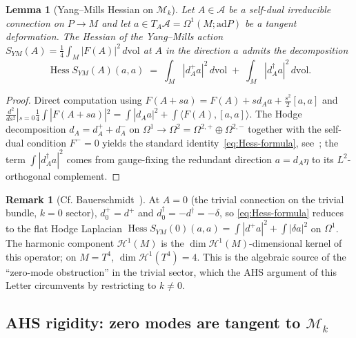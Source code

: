 \documentclass[11pt,a4paper]{amsart}
\newtheorem{lemma}[theorem]{Lemma}
\theoremstyle{definition}
\newtheorem{remark}[theorem]{Remark}
\newcommand{\abs}[1]{\left\lvert#1\right\rvert}
\newcommand{\inner}[2]{\langle #1, #2\rangle}
\newcommand{\ad}{\mathrm{ad}}
\newcommand{\dvol}{\, d\mathrm{vol}}
\newcommand{\Mmod}{\mathcal{M}}
\DeclareMathOperator{\Hess}{Hess}
\begin{document}
\begin{lemma}[Yang--Mills Hessian on $\Mmod_k$]\label{lem:Hess-Mk}
Let $A\in\mathcal A$ be a self-dual irreducible connection on
$P\to M$ and let $a\in T_A\mathcal A = \Omega^1(M;\ad P)$ be a tangent
deformation. The Hessian of the Yang--Mills action
$S_{YM}(A) = \tfrac14\int_M\abs{F(A)}^2\dvol$ at $A$ in the direction $a$
admits the decomposition
\begin{equation}\label{eq:Hess-formula}
\Hess S_{YM}(A)(a,a)
\;=\; \int_M \abs{d_A^+ a}^2 \dvol
   \;+\;\int_M \abs{d_A^\dagger a}^2 \dvol.
\end{equation}
\end{lemma}
\begin{proof}
Direct computation using $F(A+sa) = F(A) + s d_A a + \tfrac{s^2}{2}[a,a]$
and $\tfrac{d^2}{ds^2}|_{s=0}\tfrac14\int|F(A+sa)|^2 = \int|d_A a|^2 +
\int\inner{F(A)}{[a,a]}$. The Hodge decomposition
$d_A = d_A^+ + d_A^-$ on
$\Omega^1\to\Omega^2 = \Omega^{2,+}\oplus\Omega^{2,-}$ together with
the self-dual condition $F^- = 0$ yields the standard
identity~\eqref{eq:Hess-formula}, see~\cite[Eq.~(2.21)]{Atiyah1979};
the term $\int|d_A^\dagger a|^2$ comes from gauge-fixing the redundant
direction $a = d_A\eta$ to its $L^2$-orthogonal complement.
\end{proof}

\begin{remark}[Cf. Bauerschmidt~\cite{BauerschmidtDagallier2024}]
\label{rem:Hess-flat}
At $A = 0$ (the trivial connection on the trivial bundle, $k=0$
sector), $d_0^+ = d^+$ and $d_0^\dagger = -d^\dagger = -\delta$, so
\eqref{eq:Hess-formula} reduces to the flat Hodge Laplacian
$\Hess S_{YM}(0)(a,a) = \int |d^+ a|^2 + \int|\delta a|^2$ on
$\Omega^1$. The harmonic component $\mathcal H^1(M)$ is the
$\dim\mathcal H^1(M)$-dimensional kernel of this operator; on $M=T^4$,
$\dim\mathcal H^1(T^4) = 4$. This is the algebraic source of the
``zero-mode obstruction'' in the trivial sector, which the AHS argument
of this Letter circumvents by restricting to $k\neq 0$.
\end{remark}

\subsection{AHS rigidity: zero modes are tangent to $\Mmod_k$}
\end{document}
